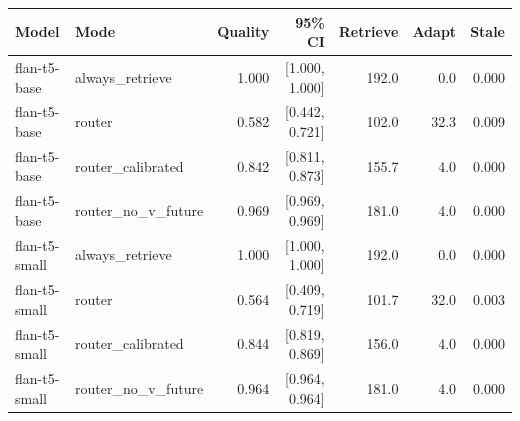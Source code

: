 \begin{tabular}{llrrrrr}
\toprule
Model & Mode & Quality & 95\% CI & Retrieve & Adapt & Stale \\
\midrule
flan-t5-base & always\_retrieve & 1.000 & [1.000, 1.000] & 192.0 & 0.0 & 0.000 \\
flan-t5-base & router & 0.582 & [0.442, 0.721] & 102.0 & 32.3 & 0.009 \\
flan-t5-base & router\_calibrated & 0.842 & [0.811, 0.873] & 155.7 & 4.0 & 0.000 \\
flan-t5-base & router\_no\_v\_future & 0.969 & [0.969, 0.969] & 181.0 & 4.0 & 0.000 \\
flan-t5-small & always\_retrieve & 1.000 & [1.000, 1.000] & 192.0 & 0.0 & 0.000 \\
flan-t5-small & router & 0.564 & [0.409, 0.719] & 101.7 & 32.0 & 0.003 \\
flan-t5-small & router\_calibrated & 0.844 & [0.819, 0.869] & 156.0 & 4.0 & 0.000 \\
flan-t5-small & router\_no\_v\_future & 0.964 & [0.964, 0.964] & 181.0 & 4.0 & 0.000 \\
\bottomrule
\end{tabular}
